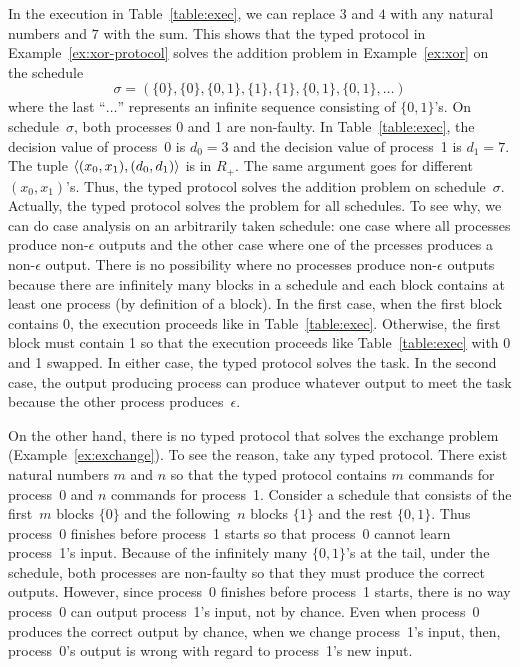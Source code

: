  \begin{example}
  \label{ex:solv}
  In the execution in Table~\ref{table:exec}, we can replace $3$ and $4$
  with any natural numbers and $7$ with the sum.
  This shows that the typed protocol in Example~\ref{ex:xor-protocol}
  solves the addition problem in Example~\ref{ex:xor} on the
  schedule
  \[
  \sigma = (\{0\}, \{0\}, \{0,1\}, \{1\}, \{1\}, \{0,1\}, \{0,1\},\ldots)
  \] where
  the last ``$\ldots$'' represents an infinite sequence consisting of
  $\{0,1\}$'s.
  On schedule~$\sigma$, both processes 0 and 1 are non-faulty.
  In Table~\ref{table:exec}, the decision value of process~0 is $d_0 =
  3$ and the decision value of process~1 is $d_1=7$.
  The tuple $\langle{(x_0,x_1),(d_0,d_1)}\rangle$ is in $R_{+}$.
  The same argument goes for different $(x_0,x_1)$'s.
  Thus, the typed protocol solves the addition problem on schedule~$\sigma$.
  Actually, the typed protocol solves the problem for all schedules.
  To see why, we can do case analysis on an arbitrarily taken schedule:
  one case where all processes produce non-$\epsilon$ outputs and the other case where
  one of the prcesses produces a non-$\epsilon$ output.  There is no possibility where no
  processes produce non-$\epsilon$ outputs because there are infinitely many blocks in a
  schedule and each block contains at least one process (by definition
  of a block).
  In the first case, when the first block
  contains 0, the execution proceeds like in Table~\ref{table:exec}.
  Otherwise, the first block must contain 1 so that the execution
  proceeds like Table~\ref{table:exec} with 0 and 1 swapped.
  In either case, the typed protocol solves the task.
  In the second case, the output producing process can
  produce whatever output to meet the task because the other process
  produces~$\epsilon$.
 \end{example}
  \begin{example}
   On the other hand, there is no typed protocol that solves
   the exchange problem (Example~\ref{ex:exchange}).
   To see the reason, take any typed protocol.
   There exist natural numbers $m$ and $n$ so that
   the typed protocol contains $m$ commands
   for process~0 and $n$ commands for process~1.
   Consider a schedule that consists of the first~$m$ blocks $\{0\}$ and
   the following~$n$ blocks $\{1\}$ and the rest $\{0,1\}$.
   Thus process~0 finishes before process~1 starts so that process~0
   cannot learn process~1's input.
   Because of the infinitely many $\{0,1\}$'s at the tail,
   under the schedule, both processes are non-faulty so that they must
   produce the correct outputs.
   However, since process~0 finishes before process~1 starts, there is
   no way process~0 can output process~1's input, not by chance.
   Even when process~0 produces the correct output by chance, when we
   change process~1's input, then, process~0's output is wrong with
   regard to process~1's new input.
  \end{example}


